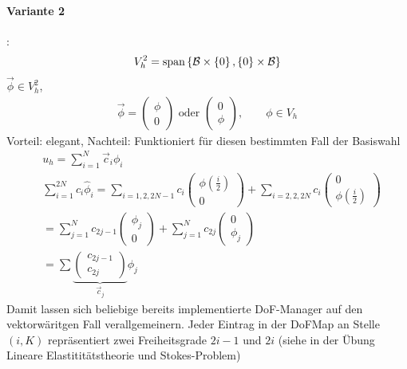\paragraph{Variante 2}:
\begin{align*}
  V_h^2 = \operatorname{span} \left\{ {\cal B} \times \left\{ 0 \right\}, \left\{ 0 \right\} \times {\cal B} \right\}
\end{align*}
$\vec \phi \in V_h^2$, 
\begin{align*}
  \vec \phi =
  \begin{pmatrix}
    \phi \\0 
  \end{pmatrix}
 \text{ oder }
  \begin{pmatrix}
    0\\\phi
  \end{pmatrix}, \qquad \phi \in V_h
\end{align*}
Vorteil: elegant, Nachteil: Funktioniert für diesen bestimmten Fall der Basiswahl
\begin{align*}
&  u_h = \sum_{i = 1}^{N} \vec c_i \phi_i\\
& \sum_{i = 1}^{2N} c_i \hat \phi_i =  \sum_{i = 1, 2, 2N-1} c_i
\begin{pmatrix}
  \phi(\frac i 2)\\0
\end{pmatrix}
+ \sum_{i = 2, 2, 2N} c_i
\begin{pmatrix}
0\\  \phi(\frac i 2)
\end{pmatrix}\\
&= \sum_{j = 1}^N c_{2j-1}
\begin{pmatrix}
  \phi_j \\0
\end{pmatrix} + \sum_{j = 1}^N c_{2j}
\begin{pmatrix}
  0\\\phi_j
\end{pmatrix}\\
&= \sum \underbrace{
\begin{pmatrix}
  c_{2j-1}\\c_{2j} 
\end{pmatrix}}_{\vec c_j}
\phi_j
\end{align*}
Damit lassen sich beliebige bereits implementierte DoF-Manager auf den vektorwäritgen Fall verallgemeinern. Jeder Eintrag in der DoFMap an Stelle $(i, K)$ repräsentiert zwei Freiheitsgrade $2i - 1$ und $2i$ (siehe in der Übung Lineare Elastititätstheorie und Stokes-Problem)
